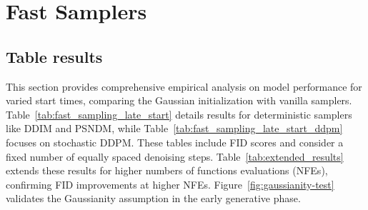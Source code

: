 \newpage
\section{Fast Samplers}
\label{supp:fast_samplers_performance}



\subsection{Table results}
This section provides comprehensive empirical analysis on model performance for varied start times, comparing the Gaussian initialization with vanilla samplers. Table~\ref{tab:fast_sampling_late_start} details results for deterministic samplers like DDIM and PSNDM, while Table~\ref{tab:fast_sampling_late_start_ddpm} focuses on stochastic DDPM. These tables include FID scores and consider a fixed number of equally spaced denoising steps. Table~\ref{tab:extended_results} extends these results for higher numbers of functions evaluations (NFEs), confirming FID improvements at higher NFEs. Figure~\ref{fig:gaussianity-test} validates the Gaussianity assumption in the early generative phase.


